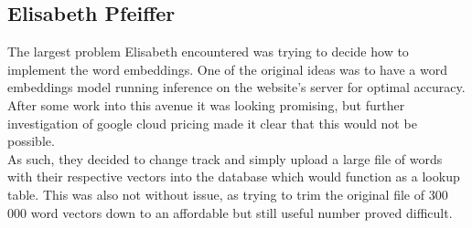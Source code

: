 \subsection{Elisabeth Pfeiffer}
The largest problem Elisabeth encountered was trying to decide how to implement the word embeddings. One of the original ideas was to have a word embeddings model running inference on the website's server for optimal accuracy. After some work into this avenue it was looking promising,  but further investigation of google cloud pricing made it clear that this would not be possible. \\
As such, they decided to change track and simply upload a large file of words with their respective vectors into the database which would function as a lookup table. This was also not without issue, as trying to trim the original file of 300 000 word vectors down to an affordable but still useful number proved difficult.
